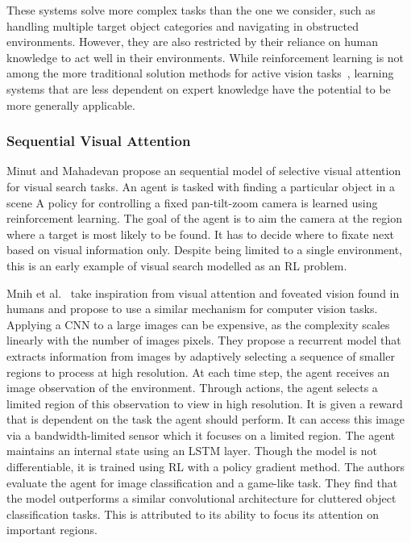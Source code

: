 These systems solve more complex tasks than the one we consider, such as handling multiple target object categories and navigating in obstructed environments.
However, they are also restricted by their reliance on human knowledge to act well in their environments.
While reinforcement learning is not among the more traditional solution methods for active vision tasks~\cite{chen_activevisionsurvey_2011},
learning systems that are less dependent on expert knowledge have the potential to be more generally applicable.

\subsubsection{Sequential Visual Attention}

Minut and Mahadevan\cite{minut_mahadevan_2001} propose an sequential model of selective visual attention for visual search tasks.
An agent is tasked with finding a particular object in a scene
A policy for controlling a fixed pan-tilt-zoom camera is learned using reinforcement learning.
The goal of the agent is to aim the camera at the region where a target is most likely to be found.
It has to decide where to fixate next based on visual information only.
Despite being limited to a single environment, this is an early example of visual search modelled as an RL problem.

Mnih et al.~\cite{mnih_attention_2014} take inspiration from visual attention and foveated vision found in humans and propose to use a similar mechanism for computer vision tasks.
Applying a CNN to a large images can be expensive, as the complexity scales linearly with the number of images pixels.
They propose a recurrent model that extracts information from images by adaptively selecting a sequence of smaller regions to process at high resolution.
At each time step, the agent receives an image observation of the environment.
Through actions, the agent selects a limited region of this observation to view in high resolution.
It is given a reward that is dependent on the task the agent should perform.
It can access this image via a bandwidth-limited sensor which it focuses on a limited region.
The agent maintains an internal state using an LSTM layer.
Though the model is not differentiable, it is trained using RL with a policy gradient method.
The authors evaluate the agent for image classification and a game-like task.
They find that the model outperforms a similar convolutional architecture for cluttered object classification tasks.
This is attributed to its ability to focus its attention on important regions.

